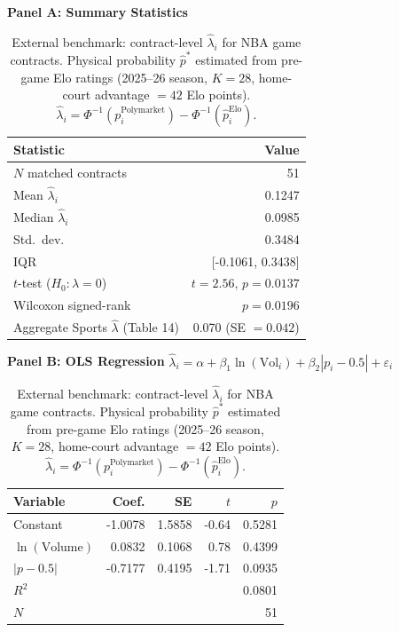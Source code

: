 \begin{table}[H]
\centering
\small
\caption{External benchmark: contract-level $\hat{\lambda}_i$ for NBA game contracts. Physical probability $\hat{p}^*$ estimated from pre-game Elo ratings (2025--26 season, $K=28$, home-court advantage $= 42$ Elo points). $\hat{\lambda}_i = \Phi^{-1}(p_i^{\text{Polymarket}}) - \Phi^{-1}(\hat{p}_i^{\text{Elo}})$.}
\label{tab:external_benchmark}
\vspace{0.3em}
\textbf{Panel A: Summary Statistics}\\[3pt]
\begin{tabular}{lr}
\toprule
Statistic & Value \\
\midrule
$N$ matched contracts & 51 \\
Mean $\hat{\lambda}_i$ & 0.1247 \\
Median $\hat{\lambda}_i$ & 0.0985 \\
Std.~dev. & 0.3484 \\
IQR & [-0.1061, 0.3438] \\
$t$-test ($H_0\colon \lambda = 0$) & $t = 2.56$, $p = 0.0137$ \\
Wilcoxon signed-rank & $p = 0.0196$ \\
\midrule
Aggregate Sports $\hat{\lambda}$ (Table 14) & 0.070 (SE $= 0.042$) \\
\bottomrule
\end{tabular}

\vspace{0.5em}
\textbf{Panel B: OLS Regression} $\hat{\lambda}_i = \alpha + \beta_1 \ln(\text{Vol}_i) + \beta_2 |p_i - 0.5| + \varepsilon_i$\\[3pt]
\begin{tabular}{lrrrr}
\toprule
Variable & Coef. & SE & $t$ & $p$ \\
\midrule
Constant & -1.0078 & 1.5858 & -0.64 & 0.5281 \\
$\ln(\text{Volume})$ & 0.0832 & 0.1068 & 0.78 & 0.4399 \\
$|p - 0.5|$ & -0.7177 & 0.4195 & -1.71 & 0.0935 \\
\midrule
$R^2$ & \multicolumn{4}{r}{0.0801} \\
$N$ & \multicolumn{4}{r}{51} \\
\bottomrule
\end{tabular}
\end{table}